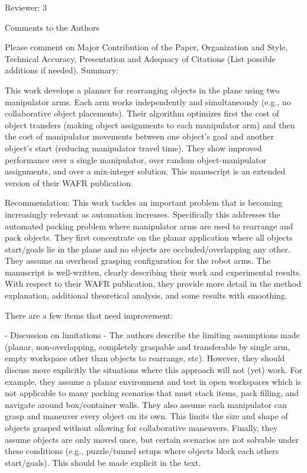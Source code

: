 \documentclass[journal]{IEEEtran}
\begin{document}
	\begin{partt}
		Reviewer: 3
		
		Comments to the Authors
		
		Please comment on Major Contribution of the Paper, Organization and Style, Technical Accuracy, Presentation and Adequacy of Citations (List possible additions if needed).
		Summary:
		
		This work develops a planner for rearranging objects in the plane using two manipulator arms.  Each arm works independently and simultaneously (e.g., no collaborative object placements).  Their algorithm optimizes first the cost of object transfers (making object assignments to each manipulator arm) and then the cost of manipulator movements between one object’s goal and another object’s start (reducing manipulator travel time).  They show improved performance over a single manipulator, over random object-manipulator assignments, and over a mix-integer solution.  This manuscript is an extended version of their WAFR publication.
		
		Recommendation:
		This work tackles an important problem that is becoming increasingly relevant as automation increases.  Specifically this addresses the automated packing problem where manipulator arms are used to rearrange and pack objects.  They first concentrate on the planar application where all objects start/goals lie in the plane and no objects are occluded/overlapping any other.  They assume an overhead grasping configuration for the robot arms.  The manuscript is well-written, clearly describing their work and experimental results.  With respect to their WAFR publication, they provide more detail in the method explanation, additional theoretical analysis, and some results with smoothing.
	\end{partt}
	
	\begin{partt}
		
		There are a few items that need improvement:
		
		- Discussion on limitations - The authors describe the limiting assumptions made (planar, non-overlapping, completely graspable and transferable by single arm, empty workspace other than objects to rearrange, etc).  However, they should discuss more explicitly the situations where this approach will not (yet) work.  For example, they assume a planar environment and test in open workspaces which is not applicable to many packing scenarios that must stack items, pack filling, and navigate around box/container walls.  They also assume each manipulator can grasp and maneuver every object on its own.  This limits the size and shape of objects grasped without allowing for collaborative maneuvers.  Finally, they assume objects are only moved once, but certain scenarios are not solvable under these conditions (e.g., puzzle/tunnel setups where objects block each others start/goals).  This should be made explicit in the text.
	\end{partt}
	
\end{document}
